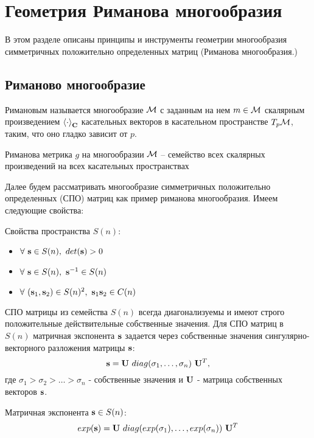 \section{Геометрия Риманова многообразия}

В этом разделе описаны принципы и инструменты геометрии многообразия симметричных положительно определенных матриц (Риманова многообразия.)

\subsection{Риманово многообразие}

\begin{definition}
Римановым называется многообразие $\mathcal{M}$ с заданным на нем  $m \in \mathcal{M}$ скалярным произведением $\left< \cdot \right>_{\bf C}$ касательных векторов в касательном пространстве $T_p \mathcal{M}$, таким, что оно гладко зависит от $p$.
\end{definition}

\begin{definition}
Риманова метрика $g$ на многообразии $\mathcal{M}$ – семейство всех скалярных произведений на всех касательных пространствах
\end{definition}

\indent Далее будем рассматривать многообразие симметричных положительно определенных (СПО) матриц как пример риманова многообразия. Имеем следующие свойства: 
\begin{lemma}
Свойства пространства $S(n)$:
\begin{itemize}
	\item $\forall \ {\bf s} \in S(n),\ det({\bf s}) > 0$
	\item $\forall \ {\bf s} \in S(n),\ {\bf s}^{-1} \in S(n)$
	\item $\forall \ (\bs_1, \bs_2) \in S(n)^2,\ \bs_1 \bs_2 \in C(n)$
\end{itemize}
\end{lemma}

\indent СПО матрицы из семейства $S(n)$ всегда диагонализуемы и имеют строго положительные действительные собственные значения. Для СПО матриц в $S(n)$ матричная экспонента ${\bf s}$ задается через собственные значения сингулярно-векторного разложения матрицы ${\bf s}$:
$$ {\bf s} = {\bf U} \ diag(\sigma_1, \ldots, \sigma_n) \ {\bf U}^T, $$
где $\sigma_1 > \sigma_2 > \ldots > \sigma_n$ - собственные значения и ${\bf U}$ - матрица собственных векторов ${\bf s}$. 
\begin{definition}
Матричная экспонента ${\bf s} \in S(n)$: 
 $$ exp({\bf s}) = {\bf U} \ diag(exp(\sigma_1), \ldots, exp(\sigma_n)) \ {\bf U}^T $$
\end{definition}

